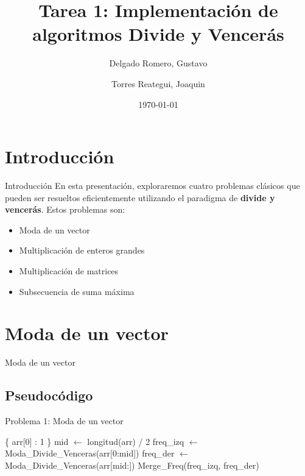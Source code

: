 \documentclass{beamer}
\title[Divide y vencerás]{Tarea 1: Implementación de algoritmos Divide y Vencerás}
\author[Delgado R. \and Torres R.]{Delgado Romero, Gustavo \inst{1} \and Torres Reategui, Joaquin\inst{2}}
\date{\today}
\begin{document}
\begin{frame}
  \titlepage
\end{frame}

\section{Introducción}
\begin{frame}{Introducción}
    En esta presentación, exploraremos cuatro problemas clásicos que pueden ser resueltos eficientemente utilizando el paradigma de \textbf{divide y vencerás}. Estos problemas son:
    \begin{itemize}
      \item Moda de un vector
      \item Multiplicación de enteros grandes
      \item Multiplicación de matrices
      \item Subsecuencia de suma máxima
    \end{itemize}
\end{frame}
\begin{frame}
    \tableofcontents[sections={2-5}]
\end{frame}


\section{Moda de un vector}
\begin{frame}{Moda de un vector}
        \tableofcontents[sections={2}]
\end{frame}
\subsection{Pseudocódigo}
\begin{frame}{Problema 1: Moda de un vector}
  \begin{algorithm}[H]
    \caption{Cálculo de la moda con Divide y Vencerás (Parte I)}
    \begin{algorithmic}[1]
          \State \Return \{ arr[0] : 1 \}
        \EndIf
        \State mid $\gets$ longitud(arr) / 2
        \State freq\_izq $\gets$ Moda\_Divide\_Venceras(arr[0:mid])
        \State freq\_der $\gets$ Moda\_Divide\_Venceras(arr[mid:])
        \State \Return Merge\_Freq(freq\_izq, freq\_der)
      \EndFunction
    \end{algorithmic}
  \end{algorithm}
\end{frame}
\end{document}
